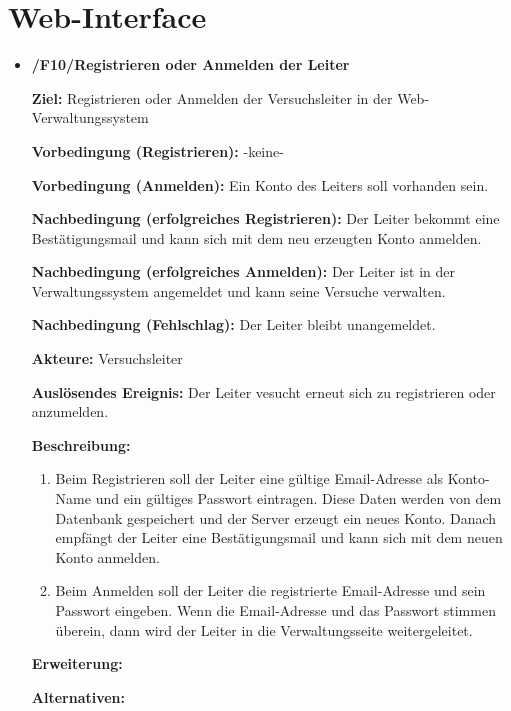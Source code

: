 \documentclass[a4paper]{scrreprt}
\begin{document}
		\section{Web-Interface}
	        \begin{itemize}
	            \item \textbf{/F10/Registrieren oder Anmelden der Leiter}
		
	            	\par \textbf{Ziel: }Registrieren oder Anmelden der Versuchsleiter in der Web-Verwaltungssystem
	            	\par \textbf{Vorbedingung (Registrieren): }-keine-
	            	\par \textbf{Vorbedingung (Anmelden): }Ein Konto des Leiters soll vorhanden sein.
	            	\par \textbf{Nachbedingung (erfolgreiches Registrieren): }Der Leiter bekommt eine Bestätigungsmail und kann sich mit dem neu erzeugten Konto anmelden.
	            	\par \textbf{Nachbedingung (erfolgreiches Anmelden): }Der Leiter ist in der Verwaltungssystem angemeldet und kann seine Versuche verwalten.
	            	\par \textbf{Nachbedingung (Fehlschlag): }Der Leiter bleibt unangemeldet.
	            	\par \textbf{Akteure: }Versuchsleiter
	            	\par \textbf{Auslösendes Ereignis: }Der Leiter vesucht erneut sich zu registrieren oder anzumelden.
	            	\par \textbf{Beschreibung: }
		            	\begin{enumerate}
		            		\item Beim Registrieren soll der Leiter eine gültige Email-Adresse als Konto-Name und ein gültiges Passwort eintragen. Diese Daten werden von dem Datenbank gespeichert und der Server erzeugt ein neues Konto. Danach empfängt der Leiter eine Bestätigungsmail und kann sich mit dem neuen Konto anmelden.
			            	\item Beim Anmelden soll der Leiter die registrierte Email-Adresse und sein Passwort eingeben. Wenn die Email-Adresse und das Passwort stimmen überein, dann wird der Leiter in die Verwaltungsseite weitergeleitet.
		            	\end{enumerate}
	            	\par \textbf{Erweiterung: }
	            	\par \textbf{Alternativen: }
	            	

\end{itemize}
\end{document}

